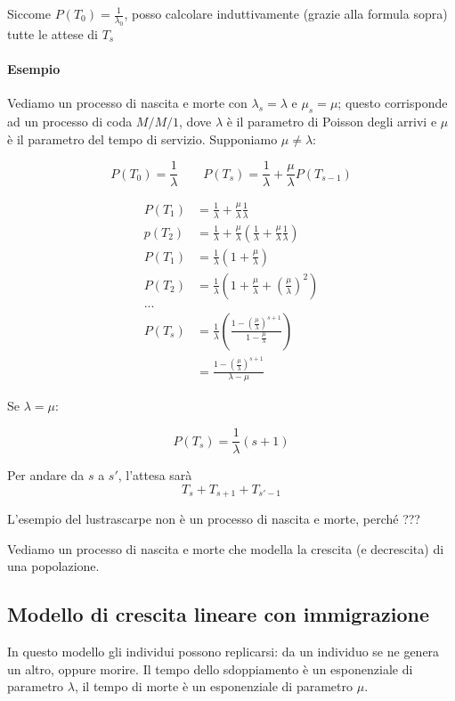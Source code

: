 \documentclass[a4paper,12pt]{book}
\newcommand\ddfrac[2]{\frac{\displaystyle #1}{\displaystyle #2}}
\begin{document}
Siccome $ P(T_0) = \frac{1}{\lambda_0}$, posso calcolare induttivamente (grazie alla formula sopra) tutte le attese di $ T_s $

\paragraph{Esempio} Vediamo un processo di nascita e morte con $\lambda_s = \lambda$ e $\mu_s = \mu$; questo corrisponde ad un processo di coda $ M/M/1 $, dove $\lambda$ è il parametro di Poisson degli arrivi e $ \mu $ è il parametro del tempo di servizio. Supponiamo $\mu \ne \lambda$:

$$ P(T_0)  = \frac{1}{\lambda} \qquad P(T_s) = \frac{1}{\lambda} + \frac{\mu}{\lambda} P(T_{s-1})$$

\begin{align*}
	P(T_1) & = \frac{1}{\lambda} + \frac{\mu}{\lambda} \frac{1}{\lambda} \\
	p(T_2) & = \frac{1}{\lambda} + \frac{\mu}{\lambda}\left( \frac{1}{\lambda} + \frac{\mu}{\lambda}\frac{1}{\lambda} \right)\\
	P(T_1) & = \frac{1}{\lambda} \left( 1 + \frac{\mu}{\lambda} \right) \\
	P(T_2) & = \frac{1}{\lambda} \left(1 + \frac{\mu}{\lambda} + \left(\frac{\mu}{\lambda}\right)^2 \right) \\
	... & \\
	P(T_s) & = \frac{1}{\lambda} \left( \frac{1 - \left(\ddfrac{\mu}{\lambda}\right)^{s+1}}{1 - \ddfrac{\mu}{\lambda}} \right) \\
	& = \frac{1 - \left(\ddfrac{\mu}{\lambda}\right)^{s+1}}{\lambda - \mu}
\end{align*}

Se $\lambda = \mu$:

$$ P(T_s) = \frac{1}{\lambda}(s+1) $$

Per andare da $ s $ a $ s' $, l'attesa sarà
$$ T_s + T_{s+1} + T_{s'-1} $$

L'esempio del lustrascarpe non è un processo di nascita e morte, perché ??? %

Vediamo un processo di nascita e morte che modella la crescita (e decrescita) di una popolazione.

\subsection{Modello di crescita lineare con immigrazione}
In questo modello gli individui possono replicarsi: da un individuo se ne genera un altro, oppure morire. Il tempo dello sdoppiamento è un esponenziale di parametro $\lambda$, il tempo di morte è un esponenziale di parametro $\mu$. 
\end{document}

